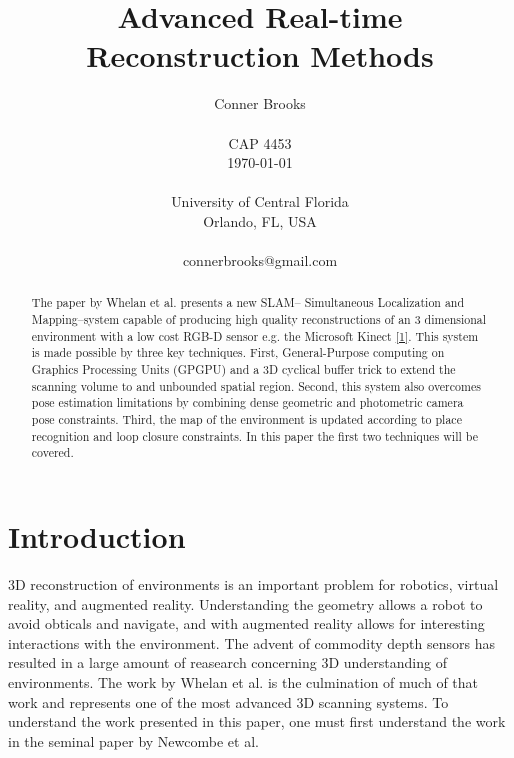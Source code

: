 \documentclass[10pt,twocolumn]{article}
\begin{document}
\title{Advanced Real-time Reconstruction Methods}

\author{Conner Brooks\\
\\
CAP 4453\\
\today \\
\\
University of Central Florida\\
Orlando, FL, USA\\
\\
connerbrooks@gmail.com\\
}

\maketitle
\thispagestyle{empty}

\begin{abstract}
  The paper by Whelan et al. presents a new SLAM--
  Simultaneous Localization and Mapping--system capable of producing high quality
  reconstructions of an 3 dimensional environment with a low cost RGB-D sensor
  e.g. the Microsoft Kinect \ref{1}. This system is made possible by three
  key techniques.
  First, General-Purpose computing on Graphics Processing Units (GPGPU) and a 3D 
  cyclical buffer trick to extend the scanning volume to and unbounded spatial
  region. Second, this system also overcomes pose estimation limitations by combining
  dense geometric and photometric camera pose constraints. Third, the map of the 
  environment is updated according to place recognition and loop closure constraints.
  In this paper the first two techniques will be covered.
\end{abstract}

\section{Introduction}
3D reconstruction of environments is an important problem for 
robotics, virtual reality, and augmented reality. Understanding the geometry
allows a robot to avoid obticals and navigate, and with augmented reality
allows for interesting interactions with the environment. The advent of
commodity depth sensors has resulted in a large amount of reasearch 
concerning 3D understanding of environments. The work by Whelan et al. is the 
culmination of much of that work and represents one of the most advanced 
3D scanning systems. To understand the work presented in this paper, one must
first understand the work in the seminal paper by Newcombe et al. 
\end{document}
